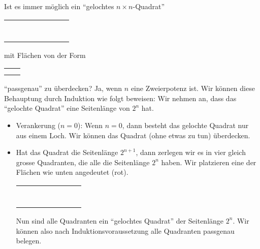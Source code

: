 \begin{bsp}\label{bsp:plättli}
Ist es immer möglich ein ``gelochtes $n\times n$-Quadrat''
\begin{center}
\begin{tabular}{ | c | c | c | c | c  | c | c | c | }
\hline
&&&&&&&\\
\hline
&&&&&&&\\
\hline
&&&&&&&\\
\hline
&&&&&&&\\
\hline
&&&&&&\cellcolor{black}&\\
\hline
&&&&&&&\\
\hline
&&&&&&&\\
\hline
&&&&&&&\\
\hline
\end{tabular}
\end{center}

mit Flächen von der Form
\begin{tabular}{ c c }
&\cellcolor{black}\\
\cellcolor{black}&\cellcolor{black}
\end{tabular}
``passgenau'' zu überdecken? Ja, wenn $n$ eine Zweierpotenz ist. Wir können diese Behauptung durch Induktion wie folgt beweisen:  Wir nehmen an, dass das ``gelochte Quadrat'' eine Seitenlänge von $2^n$ hat.
\begin{itemize}
\item Verankerung ($n=0$): Wenn $n=0$, dann besteht das gelochte Quadrat nur aus einem Loch. Wir können das Quadrat (ohne etwas zu tun) überdecken.
\item Hat das Quadrat die Seitenlänge $2^{n+1}$, dann zerlegen wir es in vier gleich grosse Quadranten, die alle die Seitenlänge $2^n$ haben. Wir platzieren eine der Flächen wie unten angedeutet (rot).
\begin{center}
\begin{tabular}{ | c | c | c | c !{\color{red}\vrule} c  | c | c | c | }
\hline
&&&&&&&\\
\hline
&&&&&&&\\
\hline
&&&&&&&\\
\hline
&&&&&&&\\
\hline
{}&&&&&&&\\
\hline
&&&&&&&\\
\hline
&&&&&&&\\
\hline
&&&&&&&\\
\hline
\end{tabular}
\end{center}
Nun sind alle Quadranten ein ``gelochtes Quadrat'' der Seitenlänge $2^n$. Wir können also nach Induktionsvoraussetzung alle Quadranten passgenau belegen.
\end{itemize}
\end{bsp}

